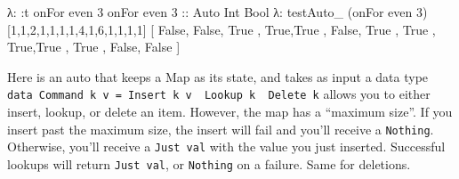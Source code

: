 \documentclass[]{article}
\newenvironment{Shaded}{}{}
\newcommand{\DataTypeTok}[1]{\textcolor[rgb]{0.56,0.13,0.00}{{#1}}}
\newcommand{\DecValTok}[1]{\textcolor[rgb]{0.25,0.63,0.44}{{#1}}}
\newcommand{\OtherTok}[1]{\textcolor[rgb]{0.00,0.44,0.13}{{#1}}}
\newcommand{\FunctionTok}[1]{\textcolor[rgb]{0.02,0.16,0.49}{{#1}}}
\newcommand{\NormalTok}[1]{{#1}}
\begin{document}
\begin{Shaded}
\begin{Highlighting}[]
\NormalTok{λ}\FunctionTok{:} \FunctionTok{:}\NormalTok{t onFor even }\DecValTok{3}
\NormalTok{onFor even }\DecValTok{3}\OtherTok{ ::} \DataTypeTok{Auto} \DataTypeTok{Int} \DataTypeTok{Bool}
\NormalTok{λ}\FunctionTok{:} \NormalTok{testAuto_ (onFor even }\DecValTok{3}\NormalTok{) [}\DecValTok{1}\NormalTok{,}\DecValTok{1}\NormalTok{,}\DecValTok{2}\NormalTok{,}\DecValTok{1}\NormalTok{,}\DecValTok{1}\NormalTok{,}\DecValTok{1}\NormalTok{,}\DecValTok{1}\NormalTok{,}\DecValTok{4}\NormalTok{,}\DecValTok{1}\NormalTok{,}\DecValTok{6}\NormalTok{,}\DecValTok{1}\NormalTok{,}\DecValTok{1}\NormalTok{,}\DecValTok{1}\NormalTok{,}\DecValTok{1}\NormalTok{]}
\NormalTok{[ }\DataTypeTok{False}\NormalTok{, }\DataTypeTok{False}\NormalTok{, }\DataTypeTok{True} \NormalTok{, }\DataTypeTok{True}\NormalTok{,}\DataTypeTok{True}
\NormalTok{, }\DataTypeTok{False}\NormalTok{, }\DataTypeTok{True} \NormalTok{, }\DataTypeTok{True} \NormalTok{, }\DataTypeTok{True}\NormalTok{,}\DataTypeTok{True}
\NormalTok{, }\DataTypeTok{True} \NormalTok{, }\DataTypeTok{False}\NormalTok{, }\DataTypeTok{False} \NormalTok{]}
\end{Highlighting}
\end{Shaded}

Here is an auto that keeps a Map as its state, and takes as input a data
type
\texttt{data\ Command\ k\ v\ =\ Insert\ k\ v\ \textbar{}\ Lookup\ k\ \textbar{}\ Delete\ k}
allows you to either insert, lookup, or delete an item. However, the map
has a ``maximum size''. If you insert past the maximum size, the insert
will fail and you'll receive a \texttt{Nothing}. Otherwise, you'll
receive a \texttt{Just\ val} with the value you just inserted.
Successful lookups will return \texttt{Just\ val}, or \texttt{Nothing}
on a failure. Same for deletions.
\end{document}
